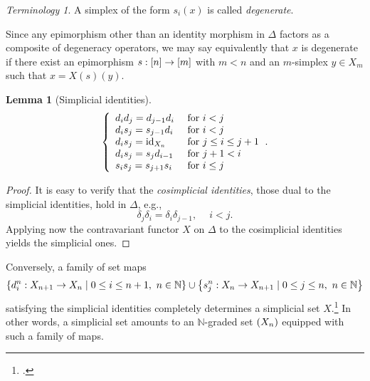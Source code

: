 \documentclass[10pt,letterpaper,cm]{nupset}
\theoremstyle{definition}
\theoremstyle{theorem}
\newtheorem{lemma}[definition]{Lemma}
\theoremstyle{remark}
\newtheorem*{term}{Terminology}
\newcommand{\0}{\mathbf{0}}
\newcommand{\1}{\mathbf{1}}
\newcommand{\2}{\mathbf{2}}
\newcommand{\N}{\mathbb N}
\DeclareMathOperator{\idd}{id}
\begin{document}
\begin{term}
A simplex of the form $s_i(x)$ is called \textit{degenerate}. 
\end{term}

Since any epimorphism other than an identity morphism in $\varDelta$ factors as a composite of degeneracy operators, we may say equivalently that $x$ is degenerate if there exist an epimorphism $s: \mleft[n\mright] \to \mleft[m\mright]$ with $m<n$ and an $m$-simplex $y\in X_m$ such that $x= X(s)(y)$.

\begin{lemma}[Simplicial identities]\label{Simpid}
\[
\mleft\{\begin{array}{ll}{d_{i} d_{j}=d_{j-1} d_{i}} & {\text { for } i<j} \\ {d_{i} s_{j}=s_{j-1} d_{i}} & {\text { for } i<j} \\ {d_{i} s_{j}= \idd_{X_n}} & {\text { for } j \leq i \leq j+1} \\ {d_{i} s_{j}=s_{j} d_{i-1}} & {\text { for } j+1<i} \\ {s_{i} s_{j}=s_{j+1} s_{i}} & {\text { for } i \leq j}\end{array}\mright..
\]
\end{lemma}
\begin{proof}
It is easy to verify that the \textit{cosimplicial identities}, those dual to the simplicial identities, hold in $\varDelta$, e.g., $$\delta_j\delta_i =\delta_i\delta_{j-1}, \ \quad i<j.$$ Applying now the  contravariant functor $X$ on $\varDelta$ to the cosimplicial identities yields the simplicial ones.
\end{proof}

Conversely, a family of set maps $$\mleft\{ d_i^n : X_{n+1} \to X_n \mid 0 \leq i \leq n+1, \ n \in \N \mright\} \cup \mleft\{s_j^n : X_n \to X_{n+1} \mid 0 \leq j \leq n, \ n \in \N\mright\}$$ satisfying the simplicial identities completely determines a simplicial set $X$.\footnote{\autocite[Lemma 6.2.8]{Rognes}.} In other words, a simplicial set amounts to an $\N$-graded set $\mleft(X_n\mright)$ equipped with such a family of maps.
\end{document}

